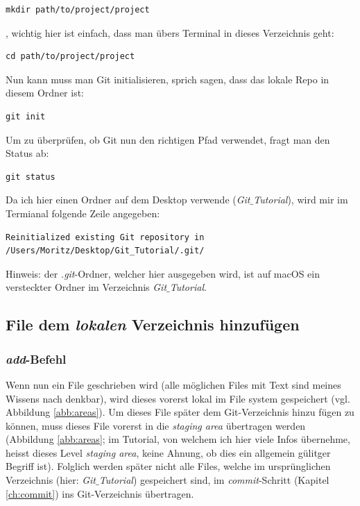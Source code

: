 \documentclass[twoside, 11pr]{article}
\begin{document}
\begin{lstlisting}
mkdir path/to/project/project
\end{lstlisting}

\noindent
, wichtig hier ist einfach, dass man übers Terminal in dieses Verzeichnis geht:

\begin{lstlisting}
cd path/to/project/project
\end{lstlisting}

\noindent
Nun kann muss man Git initialisieren, sprich sagen, dass das lokale Repo in diesem Ordner ist:

\begin{lstlisting}
git init
\end{lstlisting}

\noindent
Um zu überprüfen, ob Git nun den richtigen Pfad verwendet, fragt man den Status ab:

\begin{lstlisting}
git status
\end{lstlisting}

\noindent
Da ich hier einen Ordner auf dem Desktop verwende (\textit{Git$\_$Tutorial}), wird mir im Termianal folgende Zeile angegeben:

\begin{lstlisting}
Reinitialized existing Git repository in /Users/Moritz/Desktop/Git_Tutorial/.git/
\end{lstlisting}

\noindent
Hinweis: der \textit{.git}-Ordner, welcher hier ausgegeben wird, ist auf macOS ein versteckter Ordner im Verzeichnis \textit{Git$\_$Tutorial}.

\subsection{File dem \textit{lokalen} Verzeichnis hinzufügen}\label{ch:push}

\subsubsection{\textit{add}-Befehl}

Wenn nun ein File geschrieben wird (alle möglichen Files mit Text sind meines Wissens nach denkbar), wird dieses vorerst lokal im File system gespeichert (vgl. Abbildung \ref{abb:areas}). Um dieses File später dem Git-Verzeichnis hinzu fügen zu können, muss dieses File vorerst in die \textit{staging area} übertragen werden (Abbildung \ref{abb:areas}; im Tutorial, von welchem ich hier viele Infos übernehme, heisst dieses Level \textit{staging area}, keine Ahnung, ob dies ein allgemein gülitger Begriff ist). Folglich werden später nicht alle Files, welche im ursprünglichen Verzeichnis (hier: \textit{Git$\_$Tutorial}) gespeichert sind, im \textit{commit}-Schritt (Kapitel \ref{ch:commit}) ins Git-Verzeichnis übertragen.
\end{document}
